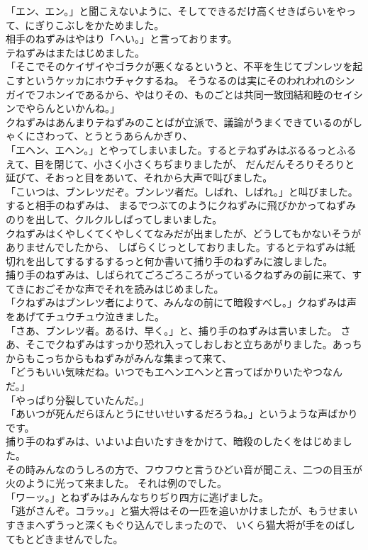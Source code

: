 \documentclass[
a4paper,
10pt,
book]
{tarticle}
\begin{document}
「エン、エン。」と聞こえないように、そしてできるだけ高くせきばらいをやって、にぎりこぶしをかためました。\\
\indent 相手のねずみはやはり「へい。」と言っております。\\
\indent テねずみはまたはじめました。\\
「そこでそのケイザイやゴラクが悪くなるというと、不平を生じてブンレツを起こすというケッカにホウチャクするね。
そうなるのは実にそのわれわれのシンガイでフホンイであるから、やはりその、ものごとは共同一致団結和睦のセイシンでやらんといかんね。」\\
\indent クねずみはあんまりテねずみのことばが立派で、議論がうまくできているのがしゃくにさわって、とうとうあらんかぎり、\\
「エヘン、エヘン。」とやってしまいました。するとテねずみはぶるるっとふるえて、目を閉じて、小さく小さくちぢまりましたが、
だんだんそろりそろりと延びて、そおっと目をあいて、それから大声で叫びました。\\
「こいつは、ブンレツだぞ。ブンレツ者だ。しばれ、しばれ。」と叫びました。すると相手のねずみは、
まるでつぶてのようにクねずみに飛びかかってねずみのりを出して、クルクルしばってしまいました。\\
\indent クねずみはくやしくてくやしくてなみだが出ましたが、どうしてもかないそうがありませんでしたから、
しばらくじっとしておりました。するとテねずみは紙切れを出してするするするっと何か書いて捕り手のねずみに渡しました。\\
\indent 捕り手のねずみは、しばられてごろごろころがっているクねずみの前に来て、すてきにおごそかな声でそれを読みはじめました。\\
「クねずみはブンレツ者によりて、みんなの前にて暗殺すべし。」クねずみは声をあげてチュウチュウ泣きました。\\
「さあ、ブンレツ者。あるけ、早く。」と、捕り手のねずみは言いました。
さあ、そこでクねずみはすっかり恐れ入ってしおしおと立ちあがりました。あっちからもこっちからもねずみがみんな集まって来て、\\
「どうもいい気味だね。いつでもエヘンエヘンと言ってばかりいたやつなんだ。」\\
「やっぱり分裂していたんだ。」\\
「あいつが死んだらほんとうにせいせいするだろうね。」というような声ばかりです。\\
\indent 捕り手のねずみは、いよいよ白いたすきをかけて、暗殺のしたくをはじめました。\\
\indent その時みんなのうしろの方で、フウフウと言うひどい音が聞こえ、二つの目玉が火のように光って来ました。
それは例のでした。\\
「ワーッ。」とねずみはみんなちりぢり四方に逃げました。\\
「逃がさんぞ。コラッ。」と猫大将はその一匹を追いかけましたが、もうせまいすきまへずうっと深くもぐり込んでしまったので、
いくら猫大将が手をのばしてもとどきませんでした。\\
\end{document}
